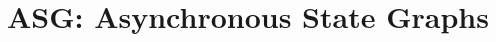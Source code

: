 \documentclass[../main.tex]{subfiles}
\begin{document}
\chapter{ASG: Asynchronous State Graphs}
\end{document}
